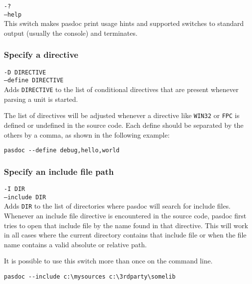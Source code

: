 \documentclass[11pt]{article}
\begin{document}
{\tt -?}\\
{\tt --help}\\

This switch makes pasdoc print usage hints and supported switches to standard
output (usually the console) and terminates.

\subsubsection{Specify a directive}
\label{specifydirective}

{\tt -D DIRECTIVE}\\
{\tt --define DIRECTIVE}\\

Adds {\tt DIRECTIVE} to the list of conditional directives that are present
whenever parsing a unit is started.

The list of directives will be adjusted whenever a directive like {\tt WIN32}
or {\tt FPC} is defined or undefined in the source code. Each define should
be separated by the others by a comma, as shown in the following example:

\begin{verbatim}
pasdoc --define debug,hello,world
\end{verbatim}

\subsubsection{Specify an include file path}
\label{specifyincludefilepath}

{\tt -I DIR}\\
{\tt --include DIR}\\

Adds {\tt DIR} to the list of directories where pasdoc will search for include
files.
Whenever an include file directive is encountered in the source code, pasdoc
first tries to open that include file by the name found in that directive.
This will work in all cases where the current directory contains that include
file or when the file name contains a valid absolute or relative path.

It is possible to use this switch more than once on the command line.

\begin{verbatim}
pasdoc --include c:\mysources c:\3rdparty\somelib
\end{verbatim}
\end{document}
